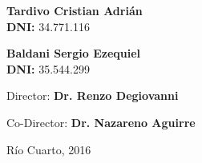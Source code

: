 \documentclass[12pt]{report}
\begin{document}
\begin{titlepage}
\begin{center}
			{\large \textbf{Tardivo Cristian Adri\'an \\ DNI:} 34.771.116}\vspace{0cm}
			
			{\large \textbf{Baldani Sergio Ezequiel \\ DNI:} 35.544.299}\vspace{1cm}
			
			{\large Director: \textbf{Dr. Renzo Degiovanni}\vspace{0,5cm}
			
			Co-Director: \textbf{Dr. Nazareno Aguirre}}\vspace{0,5cm}
			
			{\large R\'io Cuarto, 2016}
			\end{center}
	\end{titlepage}



\setcounter{tocdepth}{4}
\setcounter{secnumdepth}{4}
\setlength{\cftbeforetoctitleskip}{-2.5em}
\tableofcontents






\end{document}
